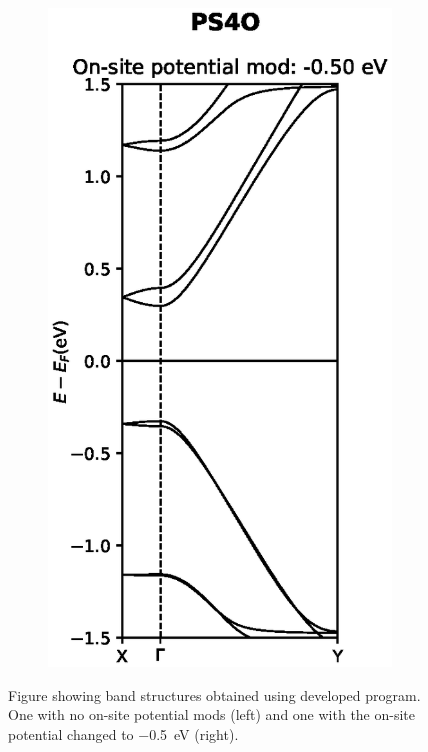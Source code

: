 \begin{figure}[h]
\begin{subfigure}[b]{0.25\textwidth}
    \label{PS4Odevnomod}
    \end{subfigure}
    ~
    \begin{subfigure}[b]{0.25\textwidth}
    \centering
    \includegraphics[width=\textwidth]{Figures/PS4Omod.eps}
    \label{PS4Odevmod}
    \end{subfigure}
    \vspace{-2\baselineskip}
    \caption{Figure showing band structures obtained using developed program. One with no on-site potential mods (left) and one with the on-site potential changed to \SI{-0.5}{\electronvolt} (right).} 
    \label{PS4Odev}
\end{figure}
